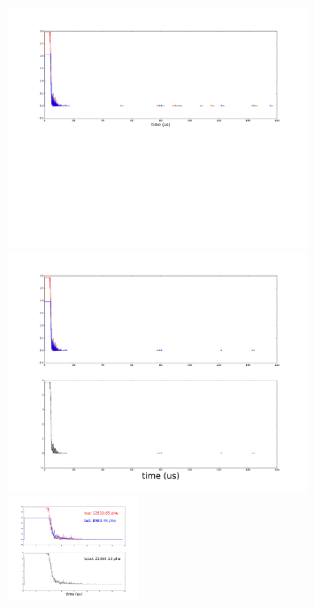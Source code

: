\begin{center}
\begin{figure}[!htbp]
  \centering
  \includegraphics[width=0.8\textwidth,clip,trim={0 600 0 0}]
  {Figures/Ch10/SampleWaveforms/_64767_a_+6_0_g_-6_0_PlotCoinWaveforms_Plotid136198_.jpg}
  \includegraphics[width=0.8\textwidth,clip,trim={0 0 0 0}]
  {Figures/Ch10/SampleWaveforms/_64767_a_+6_0_g_-6_0_Cut33_big_pulse_PlotCoinWaveforms_104_.jpg}
  \includegraphics[width=0.35\textwidth,clip,trim={0 600 0 0}]
  {Figures/Ch10/SampleWaveforms/_64767_a_+6_0_g_-6_0_PlotCoinWaveforms_Plotid11162_.jpg}

\end{figure}
\end{center}
